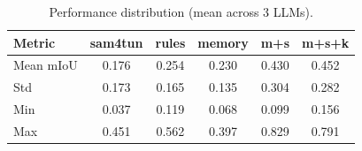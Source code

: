\begin{table}[ht]
\caption{Performance distribution (mean across 3 LLMs).}\label{tab:distribution}
\begin{tabular*}{\tblwidth}{@{} l c c c c c @{}}
\toprule
Metric & sam4tun & rules & memory & m+s & m+s+k \\
\midrule
Mean mIoU & 0.176 & 0.254 & 0.230 & 0.430 & 0.452 \\
Std & 0.173 & 0.165 & 0.135 & 0.304 & 0.282 \\
Min & 0.037 & 0.119 & 0.068 & 0.099 & 0.156 \\
Max & 0.451 & 0.562 & 0.397 & 0.829 & 0.791 \\
\bottomrule
\end{tabular*}
\end{table}


\clearpage
\FloatBarrier
